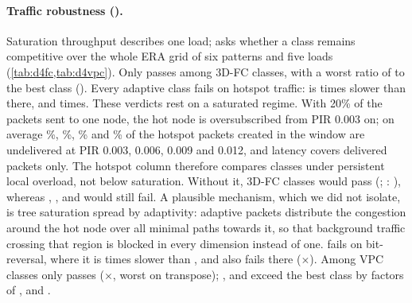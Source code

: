 \paragraph{Traffic robustness ().} Saturation throughput describes one load;  asks whether a class remains competitive over the whole ERA grid of six patterns and five loads (\cref{tab:d4fc,tab:d4vpc}). Only  passes among 3D-FC classes, with a worst ratio of  to the best class (). Every adaptive class fails on hotspot traffic:  is  times slower than  there, and   times. These verdicts rest on a saturated regime. With 20\% of the packets sent to one node, the hot node is oversubscribed from PIR 0.003 on; on average \%, \%, \% and \% of the hotspot packets created in the window are undelivered at PIR 0.003, 0.006, 0.009 and 0.012, and latency covers delivered packets only. The hotspot column therefore compares classes under persistent local overload, not below saturation. Without it,  3D-FC classes would pass  (; : ), whereas , ,  and  would still fail. A plausible mechanism, which we did not isolate, is tree saturation spread by adaptivity: adaptive packets distribute the congestion around the hot node over all minimal paths towards it, so that background traffic crossing that region is blocked in every dimension instead of one.  fails on bit-reversal, where it is  times slower than , and  also fails there ($\times$). Among VPC classes only  passes ($\times$, worst on transpose); ,  and  exceed the best class by factors of ,  and .

\begin{table}[tbp]
\centering
\caption{Traffic robustness of 3D-FC classes (). Mean latency (cycles) of delivered packets over five loads and five seeds; worst ratio to the best class of the family. Hotspot runs are saturated at PIR $\ge0.003$.}
\label{tab:d4fc}
\small
\setlength{\tabcolsep}{4pt}

\end{table}

\begin{table}[tbp]
\centering
\caption{Traffic robustness of VPC classes (); definitions as in \cref{tab:d4fc}.}
\label{tab:d4vpc}
\small
\setlength{\tabcolsep}{4pt}

\end{table}

